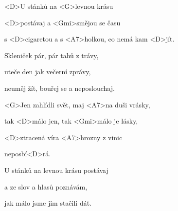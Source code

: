 

\zs
<D>U stánků na <G>levnou krásu

<D>postávaj a <Gmi>smějou se času

s <D>cigaretou a s <A7>holkou, co nemá kam <D>jít.
\ks

\zs
Skleniček pár, pár tahů z trávy,

uteče den jak večerní zprávy,

neuměj žít, bouřej se a neposlouchaj.
\ks

\zr
<G>Jen zahlídli svět, maj <A7>na duši vrásky,

tak <D>málo jen, tak <Gmi>málo je lásky,

<D>ztracená víra <A7>hrozny z vinic

neposbí<D>rá.
\kr

\zs
U stánků na levnou krásu postávaj

a ze slov a hlasů poznávám,

jak málo jsme jim stačili dát.
\ks

\zr \kr

\zr \kr

\kp
